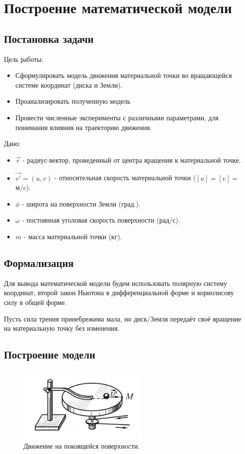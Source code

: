 \chapter{Построение математической модели}
\section{Постановка задачи}
Цель работы:
\begin{itemize}
	\item Сформулировать модель движения материальной точки во вращающейся системе координат (диска и Земли).
	\item Проанализировать полученную модель
	\item Провести численные эксперименты с различными параметрами, для понимания влияния на траекторию движения.
\end{itemize}

Дано:
\begin{itemize}
	\item $\overrightarrow{r}$ - радиус-вектор, проведенный от центра вращения к материальной точке.
	\item $\overrightarrow{v'} = (u,v)$ - относительная скорость материальной точки ($[u] = [v]=$м/c).
	\item $\phi$ - широта на поверхности Земли (град.).
	\item $\omega$ - постоянная уголовая скорость поверхности (рад/с).
	\item $m$ - масса материальной точки (кг).
\end{itemize}
\section{Формализация}
Для вывода математической модели будем использовать полярную систему координат, второй закон Ньютона в дифференциальной форме и кориолисову силу в общей форме.

Пусть сила трения принебрежима мала, но диск/Земля передаёт своё вращение на материальную точку без изменения.
\newpage
\section{Построение модели}
\begin{figure}[h]  %
	\centering
	\includegraphics[height=0.2\textwidth]{imgs/base.png}  %
	\caption{Движение на покоящейся поверхности.}  %
	\label{fig:base}  %
\end{figure}

